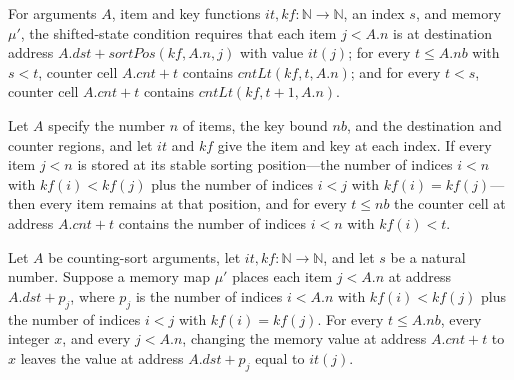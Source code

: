 \begin{definition}
\label{Light.CsShifted}
\leanok
{}
For arguments $A$, item and key functions $it,kf:\mathbb{N}\to\mathbb{N}$, an index $s$, and
memory $\mu\prime$, the shifted-state condition requires that each item $j<A.n$ is at
destination address $A.dst+sortPos(kf,A.n,j)$ with value $it(j)$; for every $t\le A.nb$
with $s<t$, counter cell $A.cnt+t$ contains $cntLt(kf,t,A.n)$; and for every $t<s$,
counter cell $A.cnt+t$ contains $cntLt(kf,t+1,A.n)$.
\end{definition}

\begin{theorem}
\label{Light.CsShifted.start}
\leanok
{}
Let $A$ specify the number $n$ of items, the key bound $nb$, and the destination and
counter regions, and let $it$ and $kf$ give the item and key at each index. If every
item $j<n$ is stored at its stable sorting position—the number of indices $i<n$ with
$kf(i)<kf(j)$ plus the number of indices $i<j$ with $kf(i)=kf(j)$—then every item
remains at that position, and for every $t\le nb$ the counter cell at address $A.cnt+t$
contains the number of indices $i<n$ with $kf(i)<t$.
\end{theorem}

\begin{theorem}
\label{Light.CsShifted.placed_update}
\leanok
{}
Let $A$ be counting-sort arguments, let $it,kf:\mathbb{N}\to\mathbb{N}$, and let $s$ be
a natural number. Suppose a memory map $\mu'$ places each item $j<A.n$ at address
$A.dst+p_j$, where $p_j$ is the number of indices $i<A.n$ with $kf(i)<kf(j)$ plus the
number of indices $i<j$ with $kf(i)=kf(j)$. For every $t\le A.nb$, every integer $x$,
and every $j<A.n$, changing the memory value at address $A.cnt+t$ to $x$ leaves the
value at address $A.dst+p_j$ equal to $it(j)$.
\end{theorem}

